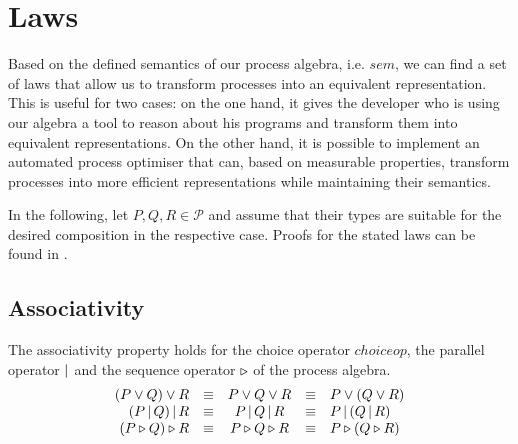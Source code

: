 
\section{Laws}
\label{chp:laws}
Based on the defined semantics of our process algebra, i.e. $sem$, we can find a set of laws that allow us to transform processes into an equivalent representation. This is useful for two cases: on the one hand, it gives the developer who is using our algebra a tool to reason about his programs and transform them into equivalent representations. On the other hand, it is possible to implement an automated process optimiser that can, based on measurable properties, transform processes into more efficient representations while maintaining their semantics.

In the following, let $P, Q, R \in \mathcal{P}$ and assume that their types are suitable for the desired composition in the respective case. Proofs for the stated laws can be found in .

\subsection{Associativity}
The associativity property holds for the choice operator $choiceop$, the parallel operator $|$ and the sequence operator $\triangleright$ of the process algebra.
\begin{equation*}
\begin{array}{rcccl}
  \left( P \vee Q \right) \vee R & \equiv & P \vee Q \vee R & \equiv & P \vee \left( Q \vee R \right) \\
  \left( P \,|\, Q \right) |\, R & \equiv & P \,|\, Q \,|\, R & \equiv & P \,| \left( Q \,|\, R \right) \\
  \left( P \triangleright Q \right) \triangleright R & \equiv & P \triangleright Q \triangleright R & \equiv & P \triangleright \left( Q \triangleright R \right)
\end{array}
\end{equation*}


